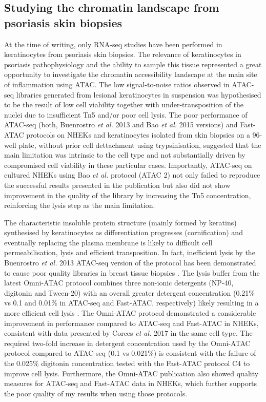 \subsection{Studying the chromatin landscape from psoriasis skin biopsies}
At the time of writing, only RNA-seq studies have been performed in keratinocytes from psoriasis skin biopsies. The relevance of keratinocytes in psoriasis pathophysiology and the ability to sample this tissue represented a great opportunity to investigate the chromatin accessibility landscape at the main site of inflammation using ATAC. The low signal-to-noise ratios observed in ATAC-seq libraries generated from lesional keratinocytes in suspension was hypothesised to be the result of low cell viability together with under-transposition of the nuclei due to insufficient Tn5 and/or poor cell lysis. The poor performance of ATAC-seq (both, Buenrostro \textit{et al.} 2013 and Bao \textit{et al.} 2015 versions) and Fast-ATAC protocols on NHEKs and keratinocytes isolated from skin biopsies on a 96-well plate, without prior cell dettachment using trypsinisation, suggested that the main limitation was intrinsic to the cell type and not substantially driven by compromised cell viability in these particular cases. Importantly, ATAC-seq on cultured NHEKs using Bao \textit{et al.} protocol (ATAC 2) not only failed to reproduce the successful results presented in the publication but also did not show improvement in the quality of the library by increasing the Tn5 concentration, reinforcing the lysis step as the main limitation.

The characteristic insoluble protein structure (mainly formed by keratins) synthesised by keratinocytes as differentiation progresses (cornification) and eventually replacing the plasma membrane is likely to difficult cell permeabilisation, lysis and efficient transposition. In fact, inefficient lysis by the Buenrostro \textit{et al.} 2013 ATAC-seq version of the protocol has been demonstrated to cause poor quality libraries in breast tissue biopsies \parencite{Fujiwara2019}. The lysis buffer from the latest Omni-ATAC protocol combines three non-ionic detergents (NP-40, digitonin and Tween-20) with an overall greater detergent concentration (0.21\% vs 0.1 and 0.01\% in ATAC-seq and Fast-ATAC, respectively) likely resulting in a more efficient cell lysis \parencite{Corces2017}.  The Omni-ATAC protocol demonstrated a considerable improvement in performance compared to ATAC-seq and Fast-ATAC in NHEKs, consistent with data presented by Corces \textit{et al.} 2017 in the same cell type. The required two-fold increase in detergent concentration used by the Omni-ATAC protocol compared to ATAC-seq (0.1 vs 0.021\%) is consistent with the failure of the 0.025\% digitonin concentration tested with the Fast-ATAC protocol C4 to improve cell lysis. Furthermore, the Omni-ATAC publication also showed quality measures for ATAC-seq and Fast-ATAC data in NHEKs, which further supports the poor quality of my results when using those protocols. 

